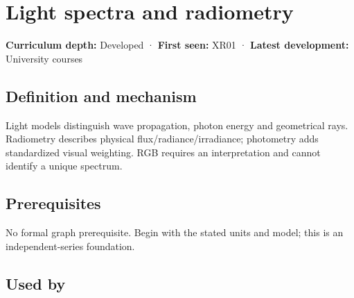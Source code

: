 \hypertarget{appendix-215c2570199b}{}\label{referencestart:appendix-215c2570199b}
\section{Light spectra and radiometry}\label{appendix-215c2570199b-light-spectra-and-radiometry}

\textbf{Curriculum depth:} Developed · \textbf{First seen:} XR01 · \textbf{Latest development:} University courses

\begin{allmightroledefinition}

\subsection{Definition and mechanism}\label{appendix-215c2570199b-definition-and-mechanism}

Light models distinguish wave propagation, photon energy and geometrical rays. Radiometry describes physical flux/radiance/irradiance; photometry adds standardized visual weighting. RGB requires an interpretation and cannot identify a unique spectrum.

\end{allmightroledefinition}

\subsection{Prerequisites}\label{appendix-215c2570199b-prerequisites}

No formal graph prerequisite. Begin with the stated units and model; this is an independent-series foundation.

\subsection{Used by}\label{appendix-215c2570199b-used-by}

